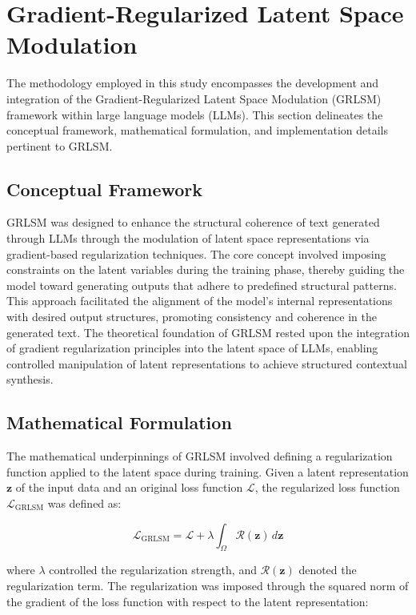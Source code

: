 \documentclass{article}
\begin{document}
\section{Gradient-Regularized Latent Space Modulation}

The methodology employed in this study encompasses the development and integration of the Gradient-Regularized Latent Space Modulation (GRLSM) framework within large language models (LLMs). This section delineates the conceptual framework, mathematical formulation, and implementation details pertinent to GRLSM.

\subsection{Conceptual Framework}

GRLSM was designed to enhance the structural coherence of text generated through LLMs through the modulation of latent space representations via gradient-based regularization techniques. The core concept involved imposing constraints on the latent variables during the training phase, thereby guiding the model toward generating outputs that adhere to predefined structural patterns. This approach facilitated the alignment of the model's internal representations with desired output structures, promoting consistency and coherence in the generated text. The theoretical foundation of GRLSM rested upon the integration of gradient regularization principles into the latent space of LLMs, enabling controlled manipulation of latent representations to achieve structured contextual synthesis.

\subsection{Mathematical Formulation}

The mathematical underpinnings of GRLSM involved defining a regularization function applied to the latent space during training. Given a latent representation \( \mathbf{z} \) of the input data and an original loss function \( \mathcal{L} \), the regularized loss function \( \mathcal{L}_{\text{GRLSM}} \) was defined as:

\[
\mathcal{L}_{\text{GRLSM}} = \mathcal{L} + \lambda \int_{\Omega} \mathcal{R}(\mathbf{z}) \, d\mathbf{z}
\]

where \( \lambda \) controlled the regularization strength, and \( \mathcal{R}(\mathbf{z}) \) denoted the regularization term. The regularization was imposed through the squared norm of the gradient of the loss function with respect to the latent representation:
\end{document}
